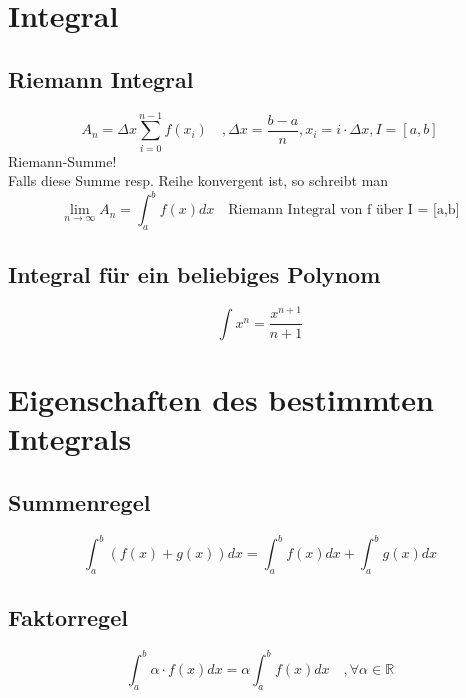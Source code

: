 



\section{Integral}
\subsection{Riemann Integral}
\[ \boxed{A_n = \Delta x \sum_{i=0}^{n-1} f(x_i) \quad 
, \Delta x = \frac{b - a}{n} , x_i = i \cdot  \Delta x , I = [a,b]} \]
Riemann-Summe! \\
Falls diese Summe resp. Reihe konvergent ist, so schreibt man
\[ \boxed{\lim_{n \rightarrow \infty} A_n = \int_{a}^{b} f(x) d x \quad 
\text{Riemann Integral von f über I = [a,b]} } \]

\subsection{Integral für ein beliebiges Polynom}
\[ \boxed{\int x^n = \frac{x^{n + 1}}{n + 1}} \]

\section{Eigenschaften des bestimmten Integrals}

\subsection{Summenregel}
\[ \boxed{\int_a^b (f(x) + g(x)) dx = \int_a^b f(x) dx + \int_a^b g(x) dx} \]

\subsection{Faktorregel}
\[ \boxed{\int_a^b \alpha \cdot f(x) dx = \alpha \int_a^b f(x) dx \quad , 
\forall \alpha \in \mathbb{R}} \]

